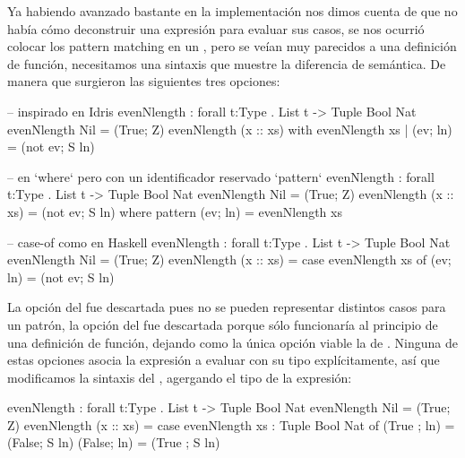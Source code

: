 {\begin{designfr}
Ya habiendo avanzado bastante en la implementación nos dimos cuenta de que no había cómo deconstruir una expresión para evaluar sus casos, se nos ocurrió colocar los pattern matching en un , pero se veían muy parecidos a una definición de función, necesitamos una sintaxis que muestre la diferencia de semántica. De manera que surgieron las siguientes tres opciones:

\begin{anglercode}[morekeywords={pattern}]
-- inspirado en Idris
evenNlength : forall t:Type . List t -> Tuple Bool Nat
evenNlength Nil = (True; Z)
evenNlength (x :: xs)
    with evenNlength xs
        | (ev; ln) = (not ev; S ln)

-- en `where` pero con un identificador reservado `pattern`
evenNlength : forall t:Type . List t -> Tuple Bool Nat
evenNlength Nil = (True; Z)
evenNlength (x :: xs) = (not ev; S ln)
    where
        pattern (ev; ln) = evenNlength xs

-- case-of como en Haskell
evenNlength : forall t:Type . List t -> Tuple Bool Nat
evenNlength Nil = (True; Z)
evenNlength (x :: xs) =
    case evenNlength xs of
        (ev; ln) = (not ev; S ln)
\end{anglercode}

La opción del  fue descartada pues no se pueden representar distintos casos para un patrón, la opción del  fue descartada porque sólo funcionaría al principio de una definición de función, dejando como la única opción viable la de . Ninguna de estas opciones asocia la expresión a evaluar con su tipo explícitamente, así que modificamos la sintaxis del , agergando el tipo de la expresión:

\begin{anglercode}
evenNlength : forall t:Type . List t -> Tuple Bool Nat
evenNlength Nil = (True; Z)
evenNlength (x :: xs) =
    case evenNlength xs : Tuple Bool Nat of
        (True ; ln) = (False; S ln)
        (False; ln) = (True ; S ln)
\end{anglercode}
\end{designfr}

}
